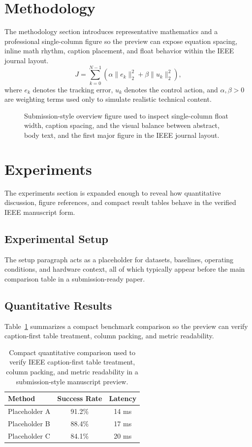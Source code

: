 \documentclass[journal]{IEEEtran}
\begin{document}
\section{Methodology}
The methodology section introduces representative mathematics and a professional single-column figure so the preview can expose equation spacing, inline math rhythm, caption placement, and float behavior within the IEEE journal layout.
\begin{equation}
J = \sum_{k=0}^{N-1} \left( \alpha \lVert e_k \rVert_2^2 + \beta \lVert u_k \rVert_2^2 \right),
\end{equation}
where $e_k$ denotes the tracking error, $u_k$ denotes the control action, and $\alpha,\beta > 0$ are weighting terms used only to simulate realistic technical content.
\begin{figure}[!t]
\centering
{}
\caption{Submission-style overview figure used to inspect single-column float width, caption spacing, and the visual balance between abstract, body text, and the first major figure in the IEEE journal layout.}
\label{fig:ieee-overview}
\end{figure}
\section{Experiments}
The experiments section is expanded enough to reveal how quantitative discussion, figure references, and compact result tables behave in the verified IEEE manuscript form.
\subsection{Experimental Setup}
The setup paragraph acts as a placeholder for datasets, baselines, operating conditions, and hardware context, all of which typically appear before the main comparison table in a submission-ready paper.
\subsection{Quantitative Results}
Table~\ref{tab:verified} summarizes a compact benchmark comparison so the preview can verify caption-first table treatment, column packing, and metric readability.
\begin{table}[!t]
\caption{Compact quantitative comparison used to verify IEEE caption-first table treatment, column packing, and metric readability in a submission-style manuscript preview.}
\label{tab:verified}
\centering
\begin{tabular}{>{\raggedright\arraybackslash}p{1.35in}cc}
\toprule
Method & Success Rate & Latency \\
\midrule
Placeholder A & 91.2\% & 14 ms \\
Placeholder B & 88.4\% & 17 ms \\
Placeholder C & 84.1\% & 20 ms \\
\bottomrule
\end{tabular}
\end{table}
\end{document}
